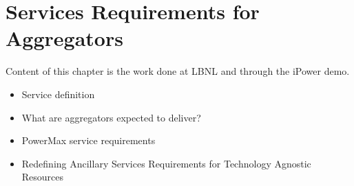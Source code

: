 \chapter{Services Requirements for Aggregators} %
\label{cha:services}
Content of this chapter is the work done at LBNL and through the iPower demo.
\begin{itemize}
	\item Service definition
	\item What are aggregators expected to deliver?
	\item PowerMax service requirements
	\item Redefining Ancillary Services Requirements for Technology Agnostic Resources
\end{itemize}

